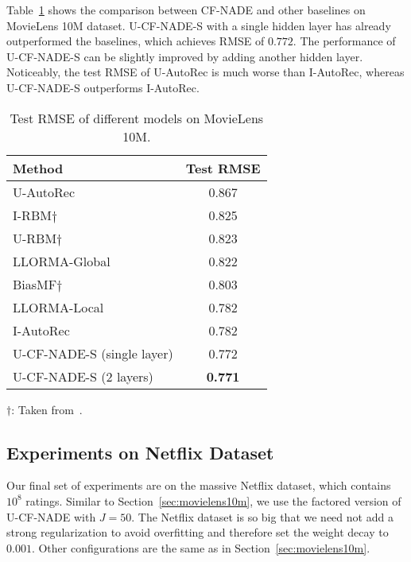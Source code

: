 \documentclass{article}
\newcommand{\cfnade}{CF-NADE\xspace}
\begin{document}
Table~\ref{tab:movielens10m} shows the comparison between \cfnade and
other baselines on MovieLens 10M dataset. U-{\cfnade}-S with a single
hidden layer has already outperformed the baselines, which achieves
RMSE of $0.772$. The performance of U-{\cfnade}-S can be slightly
improved by adding another hidden layer. Noticeably, the test RMSE of
U-AutoRec is much worse than I-AutoRec, whereas U-{\cfnade}-S
outperforms I-AutoRec.

\begin{table}[h]
 \caption{Test RMSE of different models on MovieLens 10M.}
 \label{tab:movielens10m}
 \begin{center}
 \begin{small}
 \begin{sc}
 \begin{tabular}{lc}
 \hline
 \abovespace\belowspace
 Method & Test RMSE  \\
 \hline
 \abovespace
 U-AutoRec~\citep{sedhain2015autorec} & 0.867\\
 I-RBM$\dagger$ & 0.825\\
 U-RBM$\dagger$ & 0.823\\
 LLORMA-Global~\citep{lee2013local} & 0.822\\
 BiasMF$\dagger$ & 0.803 \\
 LLORMA-Local~\citep{lee2013local} & 0.782\\
 \belowspace
 I-AutoRec~\citep{sedhain2015autorec} & 0.782\\
 U-{\cfnade}-S (single layer) & 0.772\\
 U-{\cfnade}-S (2 layers) & {\bf 0.771}\\
 \hline
 \end{tabular}
 \end{sc}
 \end{small}
 \begin{minipage}{0.48\textwidth}
{\small
$\dagger$: Taken from~\citep{sedhain2015autorec}.
}
\end{minipage}
 \end{center}
 \end{table}
 
 \subsection{Experiments on Netflix Dataset}
 \label{sec:netflix}
 Our final set of experiments are on the massive Netflix dataset,
 which contains $10^8$ ratings. Similar to
 Section~\ref{sec:movielens10m}, we use the factored version of
 U-\cfnade with $J=50$. The Netflix dataset is so big that we need not
 add a strong regularization to avoid overfitting and therefore set
 the weight decay to $0.001$. Other configurations are the same as in
 Section~\ref{sec:movielens10m}.
 
\end{document}
